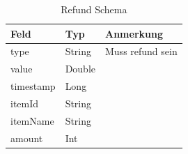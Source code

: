 \documentclass[a4paper, 11pt]{article}
\begin{document}
\begin{table}[H]
	\centering
	\begin{tabular}{@{}lll@{}}
		Feld      & Typ    & Anmerkung                     \\ \toprule
		type      & String & Muss \glqq refund\grqq{} sein \\ \midrule
		value     & Double &                               \\ \midrule
		timestamp & Long   &                               \\ \midrule
		itemId    & String &                               \\ \midrule
		itemName  & String &                               \\ \midrule
		amount    & Int    &                               \\ \bottomrule
	\end{tabular}
	\caption{Refund Schema}
	\label{tab:attachements:refund}
\end{table}
\end{document}
